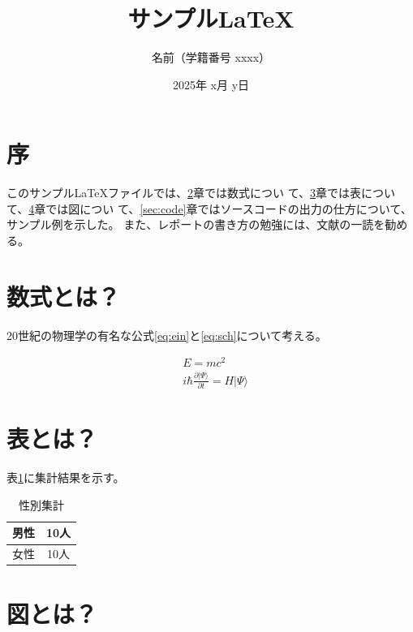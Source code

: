 \documentclass[uplatex,a4j]{jsarticle}
\begin{document}
\title{サンプル\LaTeX}
\author{名前（学籍番号 xxxx）}
\date{2025年 x月 y日}
\maketitle

\section{序}
\label{sec:intro}

このサンプル\LaTeX ファイルでは、\ref{sec:eqn}章では数式につい
て、\ref{sec:table}章では表について、\ref{sec:figure}章では図につい
て、\ref{sec:code}章ではソースコードの出力の仕方について、サンプル例を示した。
また、レポートの書き方の勉強には、文献\cite{Kinoshita}の一読を勧める。

\section{数式とは？}
\label{sec:eqn}

20世紀の物理学の有名な公式\eqref{eq:ein}と\eqref{eq:sch}について考える。

\begin{align}
  \label{eq:ein}
   & E = mc^2                                                               \\
  \label{eq:sch}
   & i\hbar\frac{\partial \vert\Psi\rangle}{\partial t} = H\vert\Psi\rangle
\end{align}

\section{表とは？}
\label{sec:table}

表\ref{tab:num}に集計結果を示す。

\begin{table}[ht]
  \centering
  \caption{性別集計}
  \label{tab:num}
  \begin{tabular}[ht]{|c|c|}
    \hline
    男性 & 10人 \\
    \hline
    女性 & 10人 \\
    \hline
  \end{tabular}
\end{table}

\section{図とは？}
\label{sec:figure}
\end{document}
